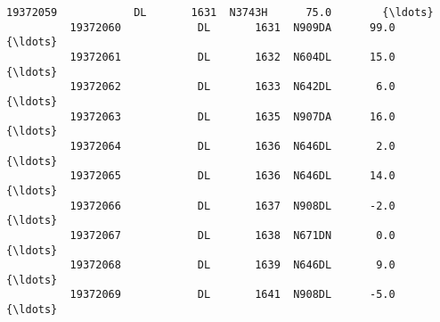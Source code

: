 \documentclass[11pt]{article}
\begin{document}
\begin{Verbatim}[commandchars=\\\{\}]
          19372059            DL       1631  N3743H      75.0        {\ldots}           
          19372060            DL       1631  N909DA      99.0        {\ldots}           
          19372061            DL       1632  N604DL      15.0        {\ldots}           
          19372062            DL       1633  N642DL       6.0        {\ldots}           
          19372063            DL       1635  N907DA      16.0        {\ldots}           
          19372064            DL       1636  N646DL       2.0        {\ldots}           
          19372065            DL       1636  N646DL      14.0        {\ldots}           
          19372066            DL       1637  N908DL      -2.0        {\ldots}           
          19372067            DL       1638  N671DN       0.0        {\ldots}           
          19372068            DL       1639  N646DL       9.0        {\ldots}           
          19372069            DL       1641  N908DL      -5.0        {\ldots}           
          

\end{Verbatim}
\end{document}
